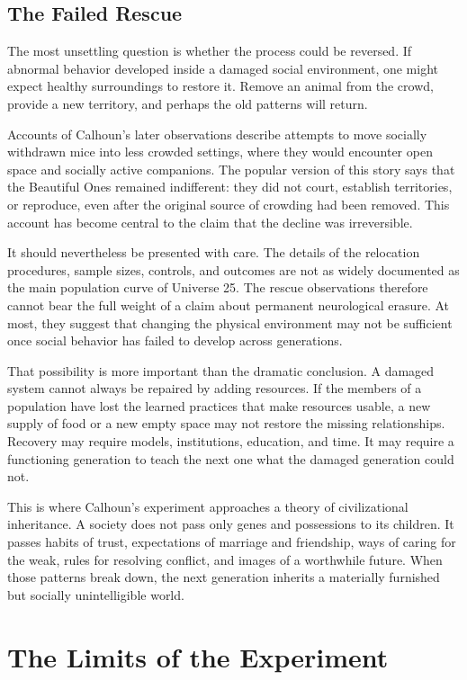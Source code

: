 ﻿\documentclass[12pt,a4paper]{book}
\begin{document}
\subsection{The Failed Rescue}

The most unsettling question is whether the process could be reversed. If abnormal behavior developed inside a damaged social environment, one might expect healthy surroundings to restore it. Remove an animal from the crowd, provide a new territory, and perhaps the old patterns will return.

Accounts of Calhoun's later observations describe attempts to move socially withdrawn mice into less crowded settings, where they would encounter open space and socially active companions. The popular version of this story says that the Beautiful Ones remained indifferent: they did not court, establish territories, or reproduce, even after the original source of crowding had been removed. This account has become central to the claim that the decline was irreversible.

It should nevertheless be presented with care. The details of the relocation procedures, sample sizes, controls, and outcomes are not as widely documented as the main population curve of Universe 25. The rescue observations therefore cannot bear the full weight of a claim about permanent neurological erasure. At most, they suggest that changing the physical environment may not be sufficient once social behavior has failed to develop across generations.

That possibility is more important than the dramatic conclusion. A damaged system cannot always be repaired by adding resources. If the members of a population have lost the learned practices that make resources usable, a new supply of food or a new empty space may not restore the missing relationships. Recovery may require models, institutions, education, and time. It may require a functioning generation to teach the next one what the damaged generation could not.

This is where Calhoun's experiment approaches a theory of civilizational inheritance. A society does not pass only genes and possessions to its children. It passes habits of trust, expectations of marriage and friendship, ways of caring for the weak, rules for resolving conflict, and images of a worthwhile future. When those patterns break down, the next generation inherits a materially furnished but socially unintelligible world.

\section{The Limits of the Experiment}
\end{document}
